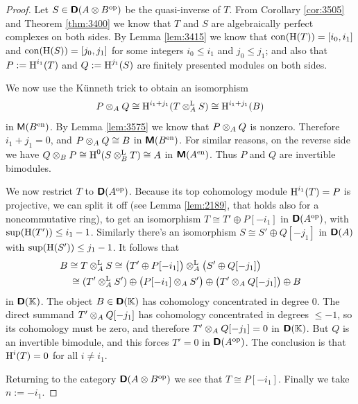 \begin{proof}
Let $S \in \boldsymbol{\mathsf{D}}(A \otimes B^{\mathrm{op}})$
be the quasi-inverse of $T$. From Corollary \ref{cor:3505} and Theorem 
\ref{thm:3400} we know that $T$ and $S$ are algebraically perfect complexes on 
both sides. By Lemma \ref{lem:3415} we know that 
$\operatorname{con}(\operatorname{H}(T)) = [i_0, i_1]$ and 
$\operatorname{con}(\operatorname{H}(S)) = [j_0, j_1]$ for some integers $i_0 \leq i_1$ and 
$j_0 \leq j_1$; and also that $P := \operatorname{H}^{i_1}(T)$ and 
$Q := \operatorname{H}^{j_1}(S)$ are finitely presented modules on both 
sides. 

We now use the K\"unneth trick to obtain an isomorphism
\[ P \otimes_A Q \cong 
\operatorname{H}^{i_1 + j_1}(T \otimes^{\mathrm{L}}_{A} S) \cong \operatorname{H}^{i_1 + j_1}(B) \]
in $\operatorname{\mathsf{M}}(B^{\mathrm{en}})$. By Lemma \ref{lem:3575} we know that 
$P \otimes_A Q$ is nonzero. Therefore $i_1 + j_1 = 0$, and 
$P \otimes_A Q \cong B$ in $\boldsymbol{\mathsf{M}}(B^{\mathrm{en}})$. 
For similar reasons, on the reverse side we have 
$Q \otimes_B P \cong \operatorname{H}^{0}(S \otimes^{\mathrm{L}}_{B} T) \cong A$
in $\boldsymbol{\mathsf{M}}(A^{\mathrm{en}})$. Thus $P$ and $Q$ are invertible bimodules. 

We now restrict $T$ to $\boldsymbol{\mathsf{D}}(A^{\mathrm{op}})$. Because its top cohomology 
module $\operatorname{H}^{i_1}(T) = P$ is projective, we can split it off (see Lemma 
\ref{lem:2189}, that holds also for a noncommutative ring), to get an 
isomorphism $T \cong T' \oplus P[-i_1]$ in $\boldsymbol{\mathsf{D}}(A^{\mathrm{op}})$, 
with $\operatorname{sup}(\operatorname{H}(T')) \leq i_1 - 1$.
Similarly there's an isomorphism 
$S \cong S' \oplus Q[-j_1]$ in $\boldsymbol{\mathsf{D}}(A)$
with $\operatorname{sup}(\operatorname{H}(S')) \leq j_1 - 1$.
It follows that 
\[ \begin{aligned}
& B \cong T \otimes^{\mathrm{L}}_{A} S \cong 
\bigl( T' \oplus P[-i_1] \bigr) \otimes^{\mathrm{L}}_{A} 
\bigl( S' \oplus Q[-j_1] \bigr) 
\\
& \quad 
\cong (T' \otimes^{\mathrm{L}}_{A} S') \oplus
\bigl( P[-i_1] \otimes_A S' \bigr) \oplus \bigl( T' \otimes_A Q[-j_1] \bigr) 
\oplus B 
\end{aligned} \]
in $\boldsymbol{\mathsf{D}}(\mathbb{K})$. The object $B \in \boldsymbol{\mathsf{D}}(\mathbb{K})$ has cohomology concentrated 
in degree $0$. The direct summand $T' \otimes_A Q[-j_1]$ has cohomology 
concentrated in degrees $\leq -1$, so its cohomology must be zero, and 
therefore $T' \otimes_A Q[-j_1] = 0$ in $\boldsymbol{\mathsf{D}}(\mathbb{K})$. 
But $Q$ is an invertible bimodule, and this forces $T' = 0$
in $\boldsymbol{\mathsf{D}}(A^{\mathrm{op}})$. The conclusion is that $\operatorname{H}^{i}(T) = 0$ for 
all $i \neq i_1$.

Returning to the category $\boldsymbol{\mathsf{D}}(A \otimes B^{\mathrm{op}})$
we see that $T \cong P[-i_1]$. Finally we take $n := -i_1$. 
\end{proof}

